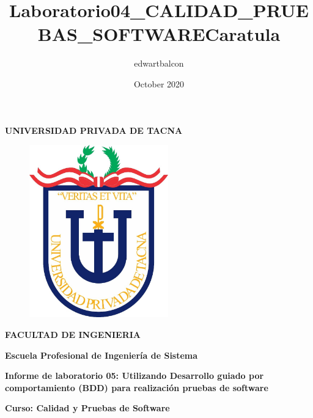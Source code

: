 \documentclass{article}
\title{Laboratorio04_CALIDAD_PRUEBAS_SOFTWARE}
\author{edwartbalcon }
\date{October 2020}
\begin{document}
\title{Caratula}

\begin{titlepage}
\begin{center}
\begin{Large}
\textbf{UNIVERSIDAD PRIVADA DE TACNA} \\
\end{Large}
\vspace*{-0.025in}
\begin{figure}[htb]
\begin{center}
\includegraphics[width=6cm]{./images/logo_UPT}
\end{center}
\end{figure}
\vspace*{-0.025in}
\begin{Large}
\textbf{FACULTAD DE INGENIERIA} \\
\end{Large}
\vspace*{0.05in}
\begin{Large}
\textbf{Escuela Profesional de Ingeniería de Sistema} \\
\end{Large}


\vspace*{0.1in}

\vspace*{0.1in}
\begin{Large}
\textbf{Informe de laboratorio 05:  Utilizando Desarrollo guiado por comportamiento (BDD)
para realización pruebas de software} \\
\end{Large}

\vspace*{0.3in}
\begin{Large}
\textbf{Curso: Calidad y Pruebas de Software} \\
\end{Large}


\end{center}
\end{titlepage}
\end{document}
